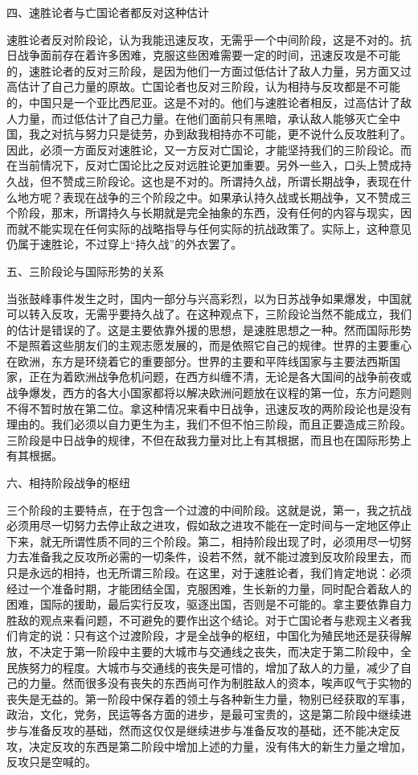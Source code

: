 四、速胜论者与亡国论者都反对这种估计

速胜论者反对阶段论，认为我能迅速反攻，无需乎一个中间阶段，这是不对的。抗日战争面前存在着许多困难，克服这些困难需要一定的时间，迅速反攻是不可能的，速胜论者的反对三阶段，是因为他们一方面过低估计了敌人力量，另方面又过高估计了自己力量的原故。亡国论者也反对三阶段，认为相持与反攻都是不可能的，中国只是一个亚比西尼亚。这是不对的。他们与速胜论者相反，过高估计了敌人力量，而过低估计了自己力量。在他们面前只有黑暗，承认敌人能够灭亡全中国，我之对抗与努力只是徒劳，办到敌我相持亦不可能，更不说什么反攻胜利了。因此，必须一方面反对速胜论，又一方反对亡国论，才能坚持我们的三阶段论。而在当前情况下，反对亡国论比之反对远胜论更加重要。另外一些入，口头上赞成持久战，但不赞成三阶段论。这也是不对的。所谓持久战，所谓长期战争，表现在什么地方呢？表现在战争的三个阶段之中。如果承认持久战或长期战争，又不赞成三个阶段，那末，所谓持久与长期就是完全抽象的东西，没有任何的内容与现实，因而就不能实现在任何实际的战略指导与任何实际的抗战政策了。实际上，这种意见仍属于速胜论，不过穿上“持久战”的外衣罢了。

五、三阶段论与国际形势的关系

当张鼓峰事件发生之时，国内一部分与兴高彩烈，以为日苏战争如果爆发，中国就可以转入反攻，无需乎要持久战了。在这种观点下，三阶段论当然不能成立，我们的估计是错误的了。这是主要依靠外援的思想，是速胜思想之一种。然而国际形势不是照着这些朋友们的主观志愿发展的，而是依照它自己的规律。世界的主要重心在欧洲，东方是环绕着它的重要部分。世界的主要和平阵线国家与主要法西斯国家，正在为着欧洲战争危机问题，在西方纠缠不清，无论是各大国间的战争前夜或战争爆发，西方的各大小国家都将以解决欧洲问题放在议程的第一位，东方问题则不得不暂时放在第二位。拿这种情况来看中日战争，迅速反攻的两阶段论也是没有理由的。我们必须以自力更生为主，我们不但不怕三阶段，而且正要造成三阶段。三阶段是中日战争的规律，不但在敌我力量对比上有其根据，而且也在国际形势上有其根据。

六、相持阶段战争的枢纽

三个阶段的主要特点，在于包含一个过渡的中间阶段。这就是说，第一，我之抗战必须用尽一切努力去停止敌之进攻，假如敌之进攻不能在一定时间与一定地区停止下来，就无所谓性质不同的三个阶段。第二，相持阶段出现了时，必须用尽一切努力去准备我之反攻所必需的一切条件，设若不然，就不能过渡到反攻阶段里去，而只是永远的相持，也无所谓三阶段。在这里，对于速胜论者，我们肯定地说：必须经过一个准备时期，才能团结全国，克服困难，生长新的力量，同时配合着敌人的困难，国际的援助，最后实行反攻，驱逐出国，否则是不可能的。拿主要依靠自力胜敌的观点来看问题，不可避免的要作出这个结论。对于亡国论者与悲观主义者我们肯定的说：只有这个过渡阶段，才是全战争的枢纽，中国化为殖民地还是获得解放，不决定于第一阶段中主要的大城市与交通线之丧失，而决定于第二阶段中，全民族努力的程度。大城市与交通线的丧失是可惜的，增加了敌人的力量，减少了自己的力量。然而很多没有丧失的东西尚可作为制胜敌人的资本，唉声叹气于实物的丧失是无益的。第一阶段中保存着的领土与各种新生力量，物别已经获取的军事，政治，文化，党务，民运等各方面的进步，是最可宝贵的，这是第二阶段中继续进步与准备反攻的基础，然而这仅仅是继续进步与准备反攻的基础，还不能决定反攻，决定反攻的东西是第二阶段中增加上述的力量，没有伟大的新生力量之增加，反攻只是空喊的。


